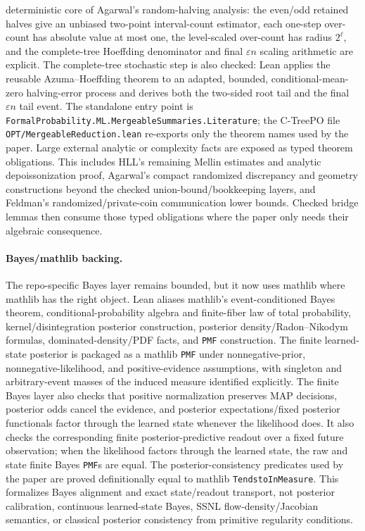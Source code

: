 deterministic core of Agarwal's random-halving analysis: the even/odd retained
halves give an unbiased two-point interval-count estimator, each one-step
over-count has absolute value at most one, the level-scaled over-count has
radius \(2^\ell\), and the complete-tree Hoeffding denominator and final
\(\varepsilon n\) scaling arithmetic are explicit. The complete-tree stochastic
step is also checked: Lean applies the reusable Azuma--Hoeffding theorem to an
adapted, bounded, conditional-mean-zero halving-error process and derives both
the two-sided root tail and the final \(\varepsilon n\) tail event.
The standalone entry point is
\texttt{FormalProbability.ML.MergeableSummaries.Literature}; the C-TreePO file
\texttt{OPT/MergeableReduction.lean} re-exports only the theorem names used by
the paper. Large external analytic or complexity facts are exposed as typed
theorem obligations. This includes HLL's remaining Mellin estimates and
analytic depoissonization proof, Agarwal's compact randomized discrepancy and
geometry constructions beyond the checked union-bound/bookkeeping layers, and
Feldman's randomized/private-coin communication lower bounds.
Checked bridge lemmas then consume those typed obligations where the paper only
needs their algebraic consequence.

\paragraph{Bayes/mathlib backing.} The repo-specific Bayes layer remains
bounded, but it now uses mathlib where mathlib has the right object. Lean
aliases mathlib's event-conditioned Bayes theorem, conditional-probability
algebra and finite-fiber law of total probability, kernel/disintegration
posterior construction, posterior density/Radon--Nikodym formulas,
dominated-density/PDF facts, and \texttt{PMF} construction. The finite
learned-state posterior is packaged as a
mathlib \texttt{PMF} under nonnegative-prior, nonnegative-likelihood, and
positive-evidence assumptions, with singleton and arbitrary-event masses of
the induced measure identified explicitly.  The finite Bayes layer also checks
that positive normalization preserves MAP decisions, posterior odds cancel the
evidence, and posterior expectations/fixed posterior functionals factor
through the learned state whenever the likelihood does. It also checks the
corresponding finite posterior-predictive readout over a fixed future
observation; when the likelihood
factors through the learned state, the raw and state finite Bayes \texttt{PMF}s
are equal. The
posterior-consistency predicates used by the paper are proved definitionally
equal to mathlib \texttt{TendstoInMeasure}. This
formalizes Bayes alignment and exact state/readout transport, not posterior
calibration, continuous learned-state Bayes, SSNL flow-density/Jacobian
semantics, or classical posterior consistency from primitive regularity
conditions.


